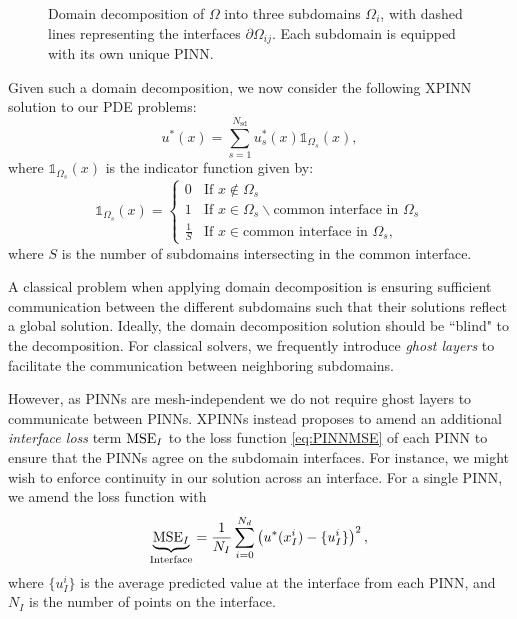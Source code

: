 \begin{figure}[h]
\centering

\caption{Domain decomposition of $\Omega$ into three subdomains $\Omega_i$, with dashed lines representing the interfaces $\partial \Omega_{ij}$. Each subdomain is equipped with its own unique PINN. }
\label{fig:subdomain_comp}
\end{figure}

Given such a domain decomposition, we now consider the following XPINN solution to our PDE problems:
\begin{equation}\label{eq:XPINN}
    u^* (x)=\sum_{s=1}^{N_\mathrm{sd}} u_{s}^*(x) \mathds{1}_{\Omega_s}(x),
\end{equation}
where $\mathds{1}_{\Omega_s}(x)$ is the indicator function given by:
\begin{equation}
    \mathds{1}_{\Omega_s}(x)=
    \begin{cases}
        0 &\text{If } x \notin \Omega_s \\
        1 &\text{If } x \in \Omega_s \backslash \text{common interface in } \Omega_s \\
        \frac{1}{S} &\text{If } x \in \text{common interface in } \Omega_s,
    \end{cases}
\end{equation}
where $S$ is the number of subdomains intersecting in the common interface.

A classical problem when applying domain decomposition is ensuring sufficient communication between the different subdomains such that their solutions reflect a global solution.
Ideally, the domain decomposition solution should be ``blind" to the decomposition.
For classical solvers, we frequently introduce \textit{ghost layers} to facilitate the communication between neighboring subdomains. 

However, as PINNs are mesh-independent we do not require ghost layers to communicate between PINNs.
XPINNs instead proposes to amend an additional \textit{interface loss} term $\operatorname{MSE}_I$ to the loss function \eqref{eq:PINNMSE} of each PINN to ensure that the PINNs agree on the subdomain interfaces.
For instance, we might wish to enforce continuity in our solution across an interface.
For a single PINN, we amend the loss function with
\begin{equation}\label{eq:MSE_I}
    \underbrace{\operatorname{MSE}_I}_{\text{Interface}} = \frac{1}{N_I} \sum_{i = 0}^{N_d} \left( u^*(x_I^i) - \{u_I^i\} \right)^2,  \\
\end{equation}
where $\{u_I^i\}$ is the average predicted value at the interface from each PINN, and $N_I$ is the number of points on the interface. 


